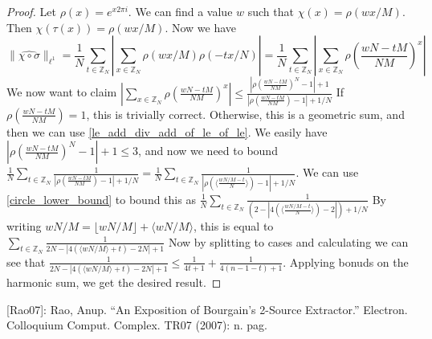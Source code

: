 \begin{proof}
    \leanok
    Let $\rho(x) = e^{x 2\pi i}$. We can find a value $w$ such that $\chi(x) = \rho(w x / M)$. Then $\chi(\tau(x)) = \rho(w x / M)$.
    Now we have
    $$\lVert \widehat{\chi \circ \sigma}\rVert_{\ell^1} = \frac{1}{N} \sum_{t \in \mathbb{Z}_N} |\sum_{x \in \mathbb{Z}_N} \rho(w x / M) \rho(- tx/N)| =
    \frac{1}{N} \sum_{t \in \mathbb{Z}_N} |\sum_{x \in \mathbb{Z}_N} \rho(\frac{w N - t M}{N M})^x|$$
    We now want to claim $|\sum_{x \in \mathbb{Z}_N} \rho(\frac{w N - t M}{N M})^x| \leq
        \frac{|\rho(\frac{w N - t M}{N M})^N - 1| + 1}{|\rho(\frac{w N - t M}{N M}) - 1| + 1/N}$
    If $\rho(\frac{w N - t M}{N M}) = 1$, this is trivially correct. Otherwise, this is a geometric sum, and then we can use
    \ref{le_add_div_add_of_le_of_le}.
    We easily have $|\rho(\frac{w N - t M}{N M})^N - 1| + 1 \leq 3$, and now we need to bound
    $\frac1N\sum_{t \in \mathbb{Z}_N} \frac1{|\rho(\frac{w N - t M}{N M}) - 1| + 1/N} = \frac1N\sum_{t \in \mathbb{Z}_N} \frac1{|\rho(\langle\frac{w N / M - t}{N}\rangle) - 1| + 1/N}$.
    We can use \ref{circle_lower_bound} to bound this as $\frac1N\sum_{t \in \mathbb{Z}_N} \frac1{(2 - |4(\langle\frac{w N / M - t}{N}\rangle) - 2|) + 1/N}$
    By writing $w N / M = \lfloor w N / M \rfloor + \langle w N / M \rangle$, this is equal to
    $\sum_{t \in \mathbb{Z}_N} \frac1{2N - |4(\langle{w N / M}\rangle + t) - 2N| + 1}$
    Now by splitting to cases and calculating we can see that $\frac1{2N - |4(\langle{w N / M}\rangle + t) - 2N| + 1} \leq \frac1{4t+1} + \frac1{4(n-1-t)+1}$.
    Applying bonuds on the harmonic sum, we get the desired result.
\end{proof}

[Rao07]: Rao, Anup. “An Exposition of Bourgain's 2-Source Extractor.” Electron. Colloquium Comput. Complex. TR07 (2007): n. pag.